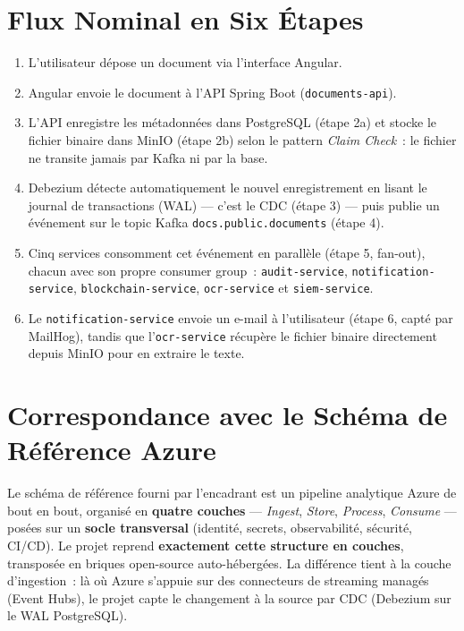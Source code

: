 \documentclass[12pt,a4paper,openany]{report}
\begin{document}
    \section{Flux Nominal en Six \'Etapes}

    \begin{enumerate}
      \item L'utilisateur d\'epose un document via l'interface Angular.
      \item Angular envoie le document \`a l'API Spring Boot (\texttt{documents-api}).
      \item L'API enregistre les m\'etadonn\'ees dans PostgreSQL (\'etape 2a) et stocke le fichier binaire dans MinIO (\'etape 2b) selon le pattern \emph{Claim Check}~: le fichier ne transite jamais par Kafka ni par la base.
      \item Debezium d\'etecte automatiquement le nouvel enregistrement en lisant le journal de transactions (WAL) --- c'est le CDC (\'etape 3) --- puis publie un \'ev\'enement sur le topic Kafka \texttt{docs.public.documents} (\'etape 4).
      \item Cinq services consomment cet \'ev\'enement en parall\`ele (\'etape 5, fan-out), chacun avec son propre consumer group~: \texttt{audit-service}, \texttt{notification-service}, \texttt{blockchain-service}, \texttt{ocr-service} et \texttt{siem-service}.
      \item Le \texttt{notification-service} envoie un e-mail \`a l'utilisateur (\'etape 6, capt\'e par MailHog), tandis que l'\texttt{ocr-service} r\'ecup\`ere le fichier binaire directement depuis MinIO pour en extraire le texte.
    \end{enumerate}

    \section{Correspondance avec le Sch\'ema de R\'ef\'erence Azure}

    Le sch\'ema de r\'ef\'erence fourni par l'encadrant est un pipeline analytique Azure de bout en bout, organis\'e en \textbf{quatre couches} --- \emph{Ingest}, \emph{Store}, \emph{Process}, \emph{Consume} --- pos\'ees sur un \textbf{socle transversal} (identit\'e, secrets, observabilit\'e, s\'ecurit\'e, CI/CD). Le projet reprend \textbf{exactement cette structure en couches}, transpos\'ee en briques open-source auto-h\'eberg\'ees. La diff\'erence tient \`a la couche d'ingestion~: l\`a o\`u Azure s'appuie sur des connecteurs de streaming manag\'es (Event Hubs), le projet capte le changement \`a la source par CDC (Debezium sur le WAL PostgreSQL).
\end{document}
